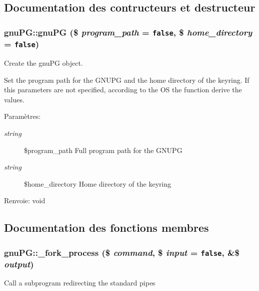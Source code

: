 \subsection{Documentation des contructeurs et destructeur}
\hypertarget{classgnuPG_a0}{
\subsubsection[gnuPG]{\setlength{\rightskip}{0pt plus 5cm}gnu\-PG::gnu\-PG (\$ {\em program\_\-path} = {\tt false}, \$ {\em home\_\-directory} = {\tt false})}}
\label{classgnuPG_a0}


Create the gnu\-PG object.

Set the program path for the GNUPG and the home directory of the keyring. If this parameters are not specified, according to the OS the function derive the values.

\begin{Desc}
\item[Param\`{e}tres:]
\begin{description}
\item[{\em string}]\$program\_\-path Full program path for the GNUPG \item[{\em string}]\$home\_\-directory Home directory of the keyring \end{description}
\end{Desc}
\begin{Desc}
\item[Renvoie:]void\end{Desc}


\subsection{Documentation des fonctions membres}
\hypertarget{classgnuPG_a1}{
\subsubsection[\_\-fork\_\-process]{\setlength{\rightskip}{0pt plus 5cm}gnu\-PG::\_\-fork\_\-process (\$ {\em command}, \$ {\em input} = {\tt false}, \&\$ {\em output})}}
\label{classgnuPG_a1}


Call a subprogram redirecting the standard pipes

